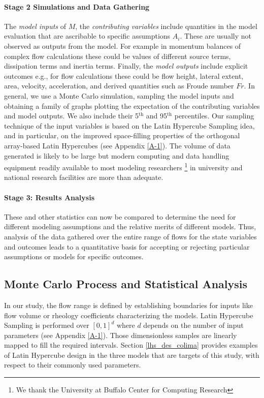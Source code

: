 \documentclass{article}
\begin{document}
\paragraph{Stage 2 Simulations and Data Gathering}
The \emph{model inputs}  of $M$, the \emph{contributing variables} include quantities in the model evaluation that are ascribable to specific assumptions $A_i$. These are usually not observed as outputs from the model. For example in momentum balances of complex flow calculations these could be values of different source terms, dissipation terms and inertia terms. Finally, the \emph{model outputs} include explicit outcomes e.g., for flow calculations these could be flow height, lateral extent, area, velocity, acceleration, and derived quantities such as Froude number $Fr$. In general, we use a Monte Carlo simulation, sampling the model inputs and obtaining a family of graphs plotting the expectation of the contributing variables and model outputs. We also include their 5$^{\mathrm{th}}$ and 95$^{\mathrm{th}}$ percentiles. Our sampling technique of the input variables is based on the Latin Hypercube Sampling idea, and in particular, on the improved space-filling properties of the orthogonal array-based Latin Hypercubes (see Appendix \ref{A-1}). The volume of data generated is likely to be large but modern computing and data handling equipment readily available to most modeling researchers \footnote{We thank the University at Buffalo Center for Computing Research} in university and national research facilities are more than adequate.

\paragraph{Stage 3: Results Analysis} These and other statistics can now be compared to determine the need for different modeling assumptions and the relative merits of different models. Thus, analysis of the data gathered over the entire range of flows for the state variables and outcomes leads to a quantitative basis for accepting or rejecting particular assumptions or models for specific outcomes.


\subsection{Monte Carlo Process and Statistical Analysis}
In our study, the flow range is defined by establishing boundaries for inputs like flow volume or rheology coefficients characterizing the models.  Latin Hypercube Sampling is performed over $[0,1]^d$ where $d$ depends on the number of  input parameters (see Appendix \ref{A-1}). Those dimensionless samples are linearly  mapped to fill the required intervals. Section \ref{lhs_des_colima} provides examples of Latin Hypercube design in the three models that are targets of this study, with respect to their commonly used parameters.
\end{document}
